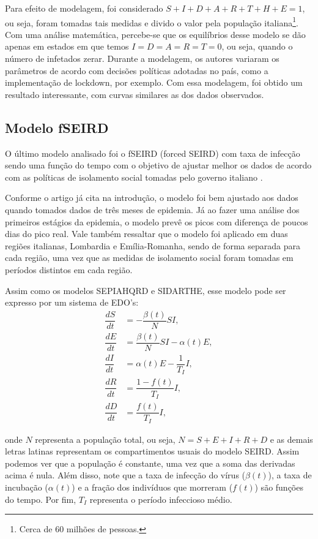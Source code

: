 \documentclass{article}
\begin{document}
Para efeito de modelagem, foi considerado $S + I + D + A + R + T + H + E = 1$, ou seja, foram tomadas tais medidas e divido o valor pela população italiana\footnote{Cerca de 60 milhões de pessoas.}. Com uma análise matemática, percebe-se que os equilíbrios desse modelo se dão apenas em estados em que temos $I = D = A = R = T = 0$, ou seja, quando o número de infetados zerar. Durante a modelagem, os autores variaram os parâmetros de acordo com decisões políticas adotadas no país, como a implementação de lockdown, por exemplo. Com essa modelagem, foi obtido um resultado interessante, com curvas similares as dos dados observados.

\subsection{Modelo fSEIRD}

O último modelo analisado foi o fSEIRD (forced SEIRD) com taxa de infecção sendo uma função do tempo com o objetivo de ajustar melhor os dados de acordo com as políticas de isolamento social tomadas pelo governo italiano \cite{piccolomini}.

Conforme o artigo já cita na introdução, o modelo foi bem ajustado aos dados quando tomados dados de três meses de epidemia. Já ao fazer uma análise dos primeiros estágios da epidemia, o modelo prevê os picos com diferença de poucos dias do pico real. Vale também ressaltar que o modelo foi aplicado em duas regiões italianas, Lombardia e Emília-Romanha, sendo de forma separada para cada região, uma vez que as medidas de isolamento social foram tomadas em períodos distintos em cada região.

Assim como os modelos SEPIAHQRD e SIDARTHE, esse modelo pode ser expresso por um sistema de EDO's:
\begin{equation}
    \label{piccolomini_model}
    \begin{split}
        \dfrac{dS}{dt} & = -\dfrac{\beta(t)}{N}SI, \\
        \dfrac{dE}{dt} & = \dfrac{\beta(t)}{N}SI - \alpha(t) E, \\
        \dfrac{dI}{dt} & = \alpha(t) E - \dfrac{1}{T_I}I, \\
        \dfrac{dR}{dt} & = \dfrac{1 - f(t)}{T_I}I, \\
        \dfrac{dD}{dt} & = \dfrac{f(t)}{T_I}I,
    \end{split}
\end{equation}

\noindent onde $N$ representa a população total, ou seja, $N = S + E + I + R + D$ e as demais letras latinas representam os compartimentos usuais do modelo SEIRD. Assim podemos ver que a população é constante, uma vez que a soma das derivadas acima é nula. Além disso, note que a taxa de infecção do vírus ($\beta(t)$), a taxa de incubação ($\alpha(t)$) e a fração dos indivíduos que morreram ($f(t)$) são funções do tempo. Por fim, $T_I$ representa o período infeccioso médio.
\end{document}

